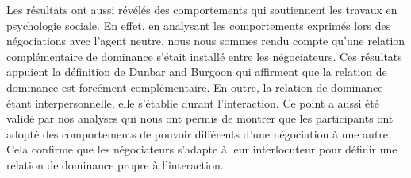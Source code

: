 		Les résultats ont aussi révélés des comportements qui soutiennent les travaux en psychologie sociale. En effet, en analysant les comportements exprimés lors des négociations avec l'agent neutre, nous nous sommes rendu compte qu'une relation complémentaire de dominance s'était installé entre les négociateurs. Ces résultats appuient la définition de Dunbar and Burgoon \cite{dunbar2005perceptions} qui affirment que la relation de dominance est forcément complémentaire. En outre, la relation de dominance étant interpersonnelle, elle s'établie durant l'interaction. Ce point a aussi été validé par nos analyses qui nous ont permis de montrer que les participants ont adopté des comportements de pouvoir différents d'une négociation à une autre. Cela confirme que les négociateurs s'adapte à leur interlocuteur pour définir une relation de dominance propre à l'interaction. 